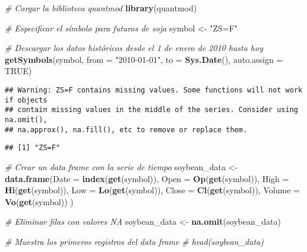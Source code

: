 \documentclass[
]{book}
\newenvironment{Shaded}{\begin{snugshade}}{\end{snugshade}}
\newcommand{\AttributeTok}[1]{\textcolor[rgb]{0.13,0.29,0.53}{#1}}
\newcommand{\CommentTok}[1]{\textcolor[rgb]{0.56,0.35,0.01}{\textit{#1}}}
\newcommand{\ConstantTok}[1]{\textcolor[rgb]{0.56,0.35,0.01}{#1}}
\newcommand{\FunctionTok}[1]{\textcolor[rgb]{0.13,0.29,0.53}{\textbf{#1}}}
\newcommand{\NormalTok}[1]{#1}
\newcommand{\OtherTok}[1]{\textcolor[rgb]{0.56,0.35,0.01}{#1}}
\newcommand{\StringTok}[1]{\textcolor[rgb]{0.31,0.60,0.02}{#1}}
\begin{document}
\begin{Shaded}
\begin{Highlighting}[]
\CommentTok{\# Cargar la biblioteca quantmod}
\FunctionTok{library}\NormalTok{(quantmod)}

\CommentTok{\# Especificar el símbolo para futuros de soja}
\NormalTok{symbol }\OtherTok{\textless{}{-}} \StringTok{"ZS=F"}

\CommentTok{\# Descargar los datos históricos desde el 1 de enero de 2010 hasta hoy}
\FunctionTok{getSymbols}\NormalTok{(symbol, }\AttributeTok{from =} \StringTok{"2010{-}01{-}01"}\NormalTok{, }\AttributeTok{to =} \FunctionTok{Sys.Date}\NormalTok{(), }\AttributeTok{auto.assign =} \ConstantTok{TRUE}\NormalTok{)}
\end{Highlighting}
\end{Shaded}

\begin{verbatim}
## Warning: ZS=F contains missing values. Some functions will not work if objects
## contain missing values in the middle of the series. Consider using na.omit(),
## na.approx(), na.fill(), etc to remove or replace them.
\end{verbatim}

\begin{verbatim}
## [1] "ZS=F"
\end{verbatim}

\begin{Shaded}
\begin{Highlighting}[]
\CommentTok{\# Crear un data frame con la serie de tiempo}
\NormalTok{soybean\_data }\OtherTok{\textless{}{-}} \FunctionTok{data.frame}\NormalTok{(}\AttributeTok{Date =} \FunctionTok{index}\NormalTok{(}\FunctionTok{get}\NormalTok{(symbol)), }
                           \AttributeTok{Open =} \FunctionTok{Op}\NormalTok{(}\FunctionTok{get}\NormalTok{(symbol)),}
                           \AttributeTok{High =} \FunctionTok{Hi}\NormalTok{(}\FunctionTok{get}\NormalTok{(symbol)),}
                           \AttributeTok{Low =} \FunctionTok{Lo}\NormalTok{(}\FunctionTok{get}\NormalTok{(symbol)),}
                           \AttributeTok{Close =} \FunctionTok{Cl}\NormalTok{(}\FunctionTok{get}\NormalTok{(symbol)),}
                           \AttributeTok{Volume =} \FunctionTok{Vo}\NormalTok{(}\FunctionTok{get}\NormalTok{(symbol))}
\NormalTok{                           )}

\CommentTok{\# Eliminar filas con valores NA}
\NormalTok{soybean\_data }\OtherTok{\textless{}{-}} \FunctionTok{na.omit}\NormalTok{(soybean\_data)}

\CommentTok{\# Muestra los primeros registros del data frame}
\CommentTok{\# head(soybean\_data)}
\end{Highlighting}
\end{Shaded}
\end{document}
